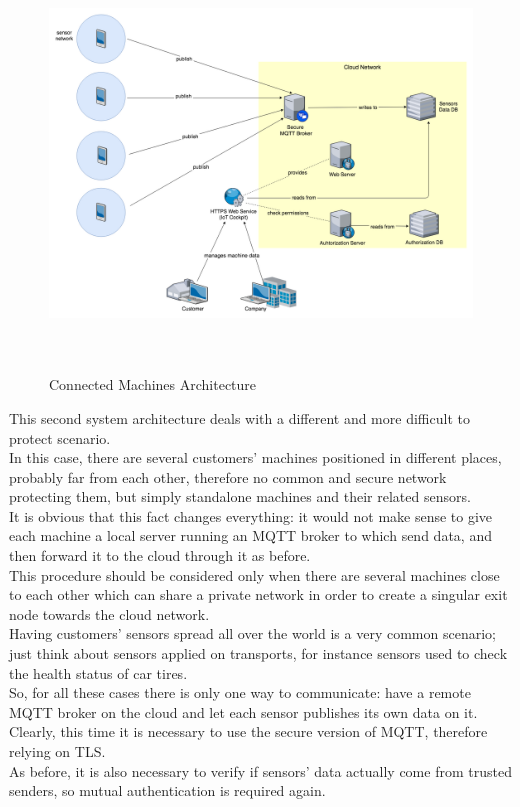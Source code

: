 \documentclass[12pt]{report}
\begin{document}
{{\begin{figure}[H]
\includegraphics[width=14cm,height=11cm,keepaspectratio]{connectedmachines_architecture}
\centering
\caption{Connected Machines Architecture}
\label{ssec:connectedmachines}
\end{figure}

This second system architecture deals with a different and more difficult to protect scenario.\\
In this case, there are several customers' machines positioned in different places, probably far from each other, therefore no common and secure network protecting them, but simply standalone machines and their related sensors.\\
It is obvious that this fact changes everything: it would not make sense to give each machine a local server running an MQTT broker to which send data, and then forward it to the cloud through it as before.\\
This procedure should be considered only when there are several machines close to each other which can share a private network in order to create a singular exit node towards the cloud network.\\

Having customers' sensors spread all over the world is a very common scenario; just think about sensors applied on transports, for instance sensors used to check the health status of car tires.\\

So, for all these cases there is only one way to communicate: have a remote MQTT broker on the cloud and let each sensor publishes its own data on it.\\
Clearly, this time it is necessary to use the secure version of MQTT, therefore relying on TLS.\\
As before, it is also necessary to verify if sensors' data actually come from trusted senders, so mutual authentication is required again.\\

}}
\end{document}
